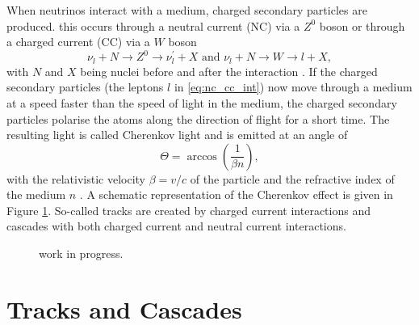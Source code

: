 When neutrinos interact with a medium, charged secondary particles are produced.
this occurs through a neutral current (NC) via a $Z^0$ boson or through a charged current (CC) via a $W$ boson
\begin{equation}
  \nu_l + N \rightarrow Z^0 \rightarrow \nu^{\prime}_l + X \text{ and }  \nu_l + N \rightarrow W \rightarrow l + X, \label{eq:nc_cc_int}
\end{equation}
with $N$ and $X$ being nuclei before and after the interaction \cite{Ahlers_2018}.
If the charged secondary particles (the leptons $l$ in \eqref{eq:nc_cc_int}) now move through a medium at a speed faster than the speed of light in the medium, the charged secondary particles polarise the atoms along the direction of flight for a short time.
The resulting light is called Cherenkov light and is emitted at an angle of
\begin{equation}
  \Theta = \arccos{\left(\frac{1}{\beta n}\right)}, \label{eq:cherenkov}
\end{equation}
with the relativistic velocity $\beta=v/c$ of the particle and the refractive index of the medium $n$ \cite{PhysRev52378} \cite{spiering}.
A schematic representation of the Cherenkov effect is given in Figure \ref{fig:cherenkov}.
So-called tracks are created by charged current interactions and cascades with both charged current and neutral current interactions.
\begin{figure}
  \centering
  \caption{work in progress.}
  \label{fig:cherenkov}
\end{figure}

\section{Tracks and Cascades}

